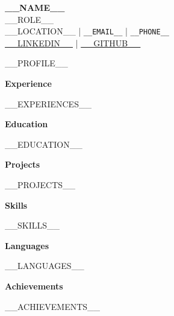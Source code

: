\documentclass[11pt,a4paper]{article}
\begin{document}
\begin{center}
    {\LARGE \textbf{__NAME__}}\\[0.3em]
    __ROLE__ \\[0.5em]
    __LOCATION__ \quad| \quad \texttt{__EMAIL__} \quad| \quad \texttt{__PHONE__} \\
    \href{https://__LINKEDIN__}{__LINKEDIN__} \quad| \quad \href{https://__GITHUB__}{__GITHUB__}
\end{center}

\vspace{1em}

__PROFILE__

\vspace{1em}

\textbf{Experience}

__EXPERIENCES__

\vspace{1em}

\textbf{Education}

__EDUCATION__

\vspace{1em}

\textbf{Projects}

__PROJECTS__

\vspace{1em}

\textbf{Skills}

__SKILLS__

\vspace{1em}

\textbf{Languages}

__LANGUAGES__

\vspace{1em}

\textbf{Achievements}

__ACHIEVEMENTS__
\end{document}
